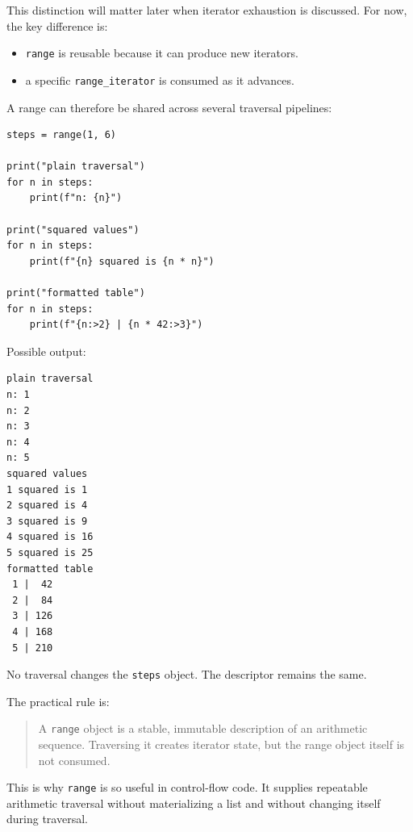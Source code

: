 This distinction will matter later when iterator exhaustion is discussed. For now, the key difference is:

\begin{itemize}
    \item \texttt{range} is reusable because it can produce new iterators.
    \item a specific \texttt{range\_iterator} is consumed as it advances.
\end{itemize}

A range can therefore be shared across several traversal pipelines:

\begin{verbatim}
steps = range(1, 6)

print("plain traversal")
for n in steps:
    print(f"n: {n}")

print("squared values")
for n in steps:
    print(f"{n} squared is {n * n}")

print("formatted table")
for n in steps:
    print(f"{n:>2} | {n * 42:>3}")
\end{verbatim}

Possible output:

\begin{verbatim}
plain traversal
n: 1
n: 2
n: 3
n: 4
n: 5
squared values
1 squared is 1
2 squared is 4
3 squared is 9
4 squared is 16
5 squared is 25
formatted table
 1 |  42
 2 |  84
 3 | 126
 4 | 168
 5 | 210
\end{verbatim}

No traversal changes the \texttt{steps} object. The descriptor remains the same.

The practical rule is:

\begin{quote}
A \texttt{range} object is a stable, immutable description of an arithmetic sequence. Traversing it creates iterator state, but the range object itself is not consumed.
\end{quote}

This is why \texttt{range} is so useful in control-flow code. It supplies repeatable arithmetic traversal without materializing a list and without changing itself during traversal.